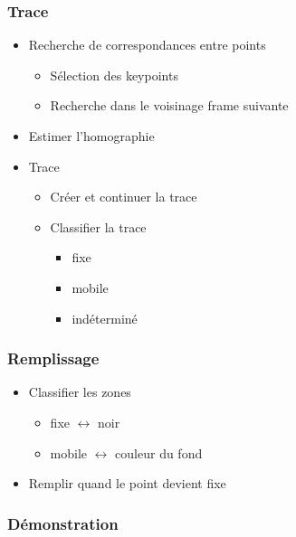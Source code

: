 \begin{frame}
  \frametitle{Trace}
  \begin{itemize}
  \item Recherche de correspondances entre points
  	\begin{itemize}
  	\item Sélection des keypoints
  	\item Recherche dans le voisinage frame suivante
  	\end{itemize}
  \item Estimer l'homographie
  \item Trace
  	\begin{itemize}
  	\item Créer et continuer la trace
  	\item Classifier la trace
  	\begin{itemize}
  		\item fixe
  		\item mobile
  		\item indéterminé
  	\end{itemize}
  	\end{itemize}
  \end{itemize}
  


\end{frame}


\begin{frame}
  \frametitle{Remplissage}
  
  \begin{itemize}
  \item Classifier les zones
  	\begin{itemize}
  	\item fixe $\leftrightarrow$ noir
  	\item mobile $\leftrightarrow$ couleur du fond
  	\end{itemize}
  \item Remplir quand le point devient fixe  
  \end{itemize}


\end{frame}


 \begin{frame}
   \frametitle{Démonstration}


 \end{frame}